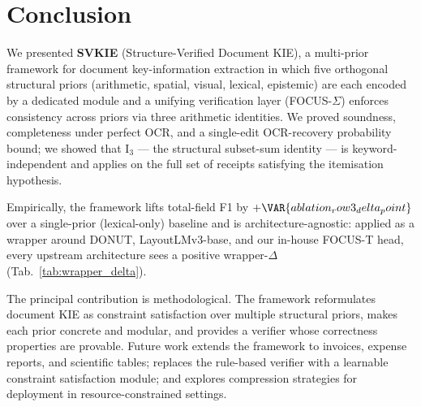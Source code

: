 \section{Conclusion}
\label{sec:conclusion}

We presented \textbf{SVKIE} (Structure-Verified Document KIE), a
multi-prior framework for document key-information extraction in
which five orthogonal structural priors (arithmetic, spatial,
visual, lexical, epistemic) are each encoded by a dedicated module
and a unifying verification layer (FOCUS-$\Sigma$) enforces
consistency across priors via three arithmetic identities.  We
proved soundness, completeness under perfect OCR, and a
single-edit OCR-recovery probability bound; we showed that
$\mathrm{I}_3$ — the structural subset-sum identity — is
keyword-independent and applies on the full set of receipts
satisfying the itemisation hypothesis.

Empirically, the framework lifts \textsf{total}-field F1 by
$+\VAR{ablation_row3_delta_point}$ over a single-prior (lexical-only)
baseline and is architecture-agnostic: applied as a wrapper around
DONUT, LayoutLMv3-base, and our in-house FOCUS-T head, every
upstream architecture sees a positive wrapper-$\Delta$
(Tab.~\ref{tab:wrapper_delta}).

The principal contribution is methodological.  The framework
reformulates document KIE as constraint satisfaction over multiple
structural priors, makes each prior concrete and modular, and
provides a verifier whose correctness properties are provable.
Future work extends the framework to invoices, expense reports, and
scientific tables; replaces the rule-based verifier with a learnable
constraint satisfaction module; and explores compression strategies
for deployment in resource-constrained settings.
